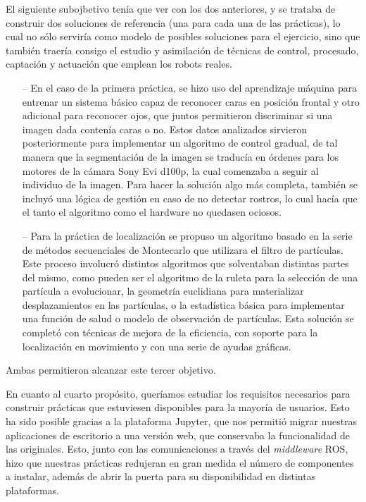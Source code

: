 El siguiente subojbetivo tenía que ver con los dos anteriores, y se trataba de construir dos soluciones de referencia (una para cada una de las prácticas), lo cual no sólo serviría como modelo de posibles soluciones para el ejercicio, sino que también traería consigo el estudio y asimilación de técnicas de control, procesado, captación y actuación que emplean los robots reales. 

\begin{itemize}
	\item[--] En el caso de la primera práctica, se hizo uso del aprendizaje máquina para entrenar un sistema básico capaz de reconocer caras en posición frontal y otro adicional para reconocer ojos, que juntos permitieron discriminar si una imagen dada contenía caras o no. Estos datos analizados sirvieron posteriormente para implementar un algoritmo de control gradual, de tal manera que la segmentación de la imagen se traducía en órdenes para los motores de la cámara Sony Evi d100p, la cual comenzaba a seguir al individuo de la imagen. Para hacer la solución algo más completa, también se incluyó una lógica de gestión en caso de no detectar rostros, lo cual hacía que el tanto el algoritmo como el hardware no quedasen ociosos.
	\item[--] Para la práctica de localización se propuso un algoritmo basado en la serie de métodos secuenciales  de Montecarlo que utilizara el filtro de partículas. Este proceso involucró distintos algoritmos que solventaban distintas partes del mismo, como pueden ser el algoritmo de la ruleta para la selección de una partícula a evolucionar, la geometría euclidiana para materializar desplazamientos en las partículas, o la estadística básica para implementar una función de salud o modelo de observación de partículas. Esta solución se completó con técnicas de mejora de la eficiencia, con soporte para la localización en movimiento y con una serie de ayudas gráficas.
\end{itemize}

Ambas permitieron alcanzar este tercer objetivo.

En cuanto al cuarto propósito, queríamos estudiar los requisitos necesarios para construir prácticas que estuviesen disponibles para la mayoría de usuarios. Esto ha sido posible gracias a la plataforma Jupyter, que nos permitió migrar nuestras aplicaciones de escritorio a una versión web, que conservaba la funcionalidad de las originales. Esto,  junto con las comunicaciones a través del \textit{middleware} ROS, hizo que nuestras prácticas redujeran en gran medida el número de componentes a instalar, además de abrir la puerta para su disponibilidad en distintas plataformas.

